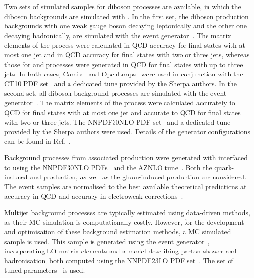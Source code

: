 Two sets of simulated samples for diboson processes are available, in which the diboson backgrounds are simulated with \SHERPA.
In the first set, the diboson production backgrounds with one weak gauge boson decaying leptonically and the other one decaying hadronically, are simulated with the  event generator~\cite{Bothmann2019}. The matrix elements of the \HepProcess{\PZ\PZ} process were calculated in \NLO QCD accuracy for final states with at most one jet and in \LO QCD accuracy for final states with two or three jets, whereas those for \HepProcess{\PW\PZ} and \HepProcess{\PW\PW} processes were generated in \LO QCD for final states with up to three jets. In both cases, Comix~\cite{Gleisberg:2008fv} and OpenLoops~\cite{Cascioli:2011va} were used in conjunction with the \textsc{CT10} PDF set~\cite{Lai2010} and a dedicated tune provided by the Sherpa authors.
In the second set, all diboson background processes are simulated with the  event generator~\cite{Bothmann2019}. The matrix elements of the process were calculated accurately to \NLO QCD for final states with at most one jet and accurate to \LO QCD for final states with two or three jets. The \textsc{NNPDF30NLO} PDF set~\cite{Ball2015} and a dedicated tune provided by the Sherpa authors were used.
Details of the generator configurations can be found in Ref.~\cite{ATL-PHYS-PUB-2017-005}.

Background processes from associated \VHbb production were generated with  interfaced to  using the \textsc{NNPDF30NLO} PDFs~\cite{Ball2015} and the AZNLO tune~\cite{STDM-2012-23}. Both the quark-induced \HepProcess{\PW\PHiggs} and \HepProcess{\PZ\PHiggs} production, as well as the gluon-induced \HepProcess{\PZ \PHiggs} production are considered. The event samples are normalised to the best available theoretical predictions at \NNLO accuracy in QCD and \NLO accuracy in electroweak corrections~\cite{CERN2017}.

Multijet background processes are typically estimated using data-driven methods, as their MC simulation is computationally costly. However, for the development and optimisation of these background estimation methods, a MC simulated sample is used. This sample is generated using the  event generator~\cite{Bothmann2019}, incorporating LO matrix elements and a model describing parton shower and hadronisation, both computed using the \textsc{NNPDF23LO} PDF set~\cite{Ball:2012cx}. The \AFourteen set of tuned parameters~\cite{ATL-PHYS-PUB-2014-021} is used.

